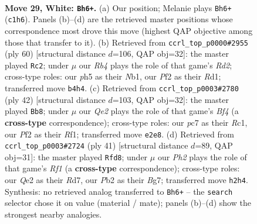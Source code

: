 \documentclass[11pt]{article}
\begin{document}
\clearpage

\begin{figure}[p]\centering
\begin{subfigure}{0.46\textwidth}\centering
\resizebox{\linewidth}{!}{%
\newchessgame
\chessboard[
  setfen={r2qr3/ppp3k1/3b1pp1/3b3p/PR6/2N3P1/RPP1QP1P/2B3K1 w - - 0 29},
  showmover=false,
  pgfstyle=straightmove, color=movearrow, markmove={c1-h6}
]}
\caption{}
\end{subfigure}\hfill
\begin{subfigure}{0.46\textwidth}\centering
\resizebox{\linewidth}{!}{%
\newchessgame
\chessboard[
  setfen={1kr1b3/1pq2p1B/4pQ1p/p1bpP3/7P/Pn4P1/3R1PK1/1N1R4 w - - 9 31},
  showmover=false,
  pgfstyle=straightmove, color=movearrow, markmove={d2-c2}
]}
\caption{}
\end{subfigure}
\\[4pt]
\begin{subfigure}{0.46\textwidth}\centering
\resizebox{\linewidth}{!}{%
\newchessgame
\chessboard[
  setfen={2bqr1k1/p2r1pb1/1p5p/2pP2p1/Q1P2B2/2N4P/P4PP1/2R2RK1 w - - 0 22},
  showmover=false,
  pgfstyle=straightmove, color=movearrow, markmove={f4-b8}
]}
\caption{}
\end{subfigure}\hfill
\begin{subfigure}{0.46\textwidth}\centering
\resizebox{\linewidth}{!}{%
\newchessgame
\chessboard[
  setfen={5rk1/pp1r1pb1/1qp3pp/4n3/5B2/1P2P3/P1Q1BPPP/2RR2K1 b - - 5 21},
  showmover=false,
  pgfstyle=straightmove, color=movearrow, markmove={f8-d8}
]}
\caption{}
\end{subfigure}
\caption{\textbf{Move 29, White: \texttt{Bh6+}.} (a) Our position; Melanie plays \texttt{Bh6+} (\texttt{c1h6}). Panels (b)--(d) are the retrieved master positions whose correspondence most drove this move (highest QAP objective among those that transfer to it). (b) Retrieved from \texttt{ccrl\_top\_p0000\#2955} (ply 60) [structural distance $d$=106, QAP obj=32]: the master played \texttt{Rc2}; under $\mu$ our \emph{Rb4} plays the role of that game's \emph{Rd2}; cross-type roles: our \emph{p}h5 as their \emph{N}b1, our \emph{P}f2 as their \emph{R}d1; transferred move \texttt{b4h4}. (c) Retrieved from \texttt{ccrl\_top\_p0003\#2780} (ply 42) [structural distance $d$=103, QAP obj=32]: the master played \texttt{Bb8}; under $\mu$ our \emph{Qe2} plays the role of that game's \emph{Bf4} (a \textbf{cross-type} correspondence); cross-type roles: our \emph{p}c7 as their \emph{R}c1, our \emph{P}f2 as their \emph{R}f1; transferred move \texttt{e2e8}. (d) Retrieved from \texttt{ccrl\_top\_p0003\#2724} (ply 41) [structural distance $d$=89, QAP obj=31]: the master played \texttt{Rfd8}; under $\mu$ our \emph{Ph2} plays the role of that game's \emph{Rf1} (a \textbf{cross-type} correspondence); cross-type roles: our \emph{Q}e2 as their \emph{R}d7, our \emph{P}b2 as their \emph{B}g7; transferred move \texttt{h2h4}. Synthesis: no retrieved analog transferred to \texttt{Bh6+} -- the \texttt{search} selector chose it on value (material / mate); panels (b)--(d) show the strongest nearby analogies.}
\label{fig:thought-m56}
\end{figure}
\end{document}
